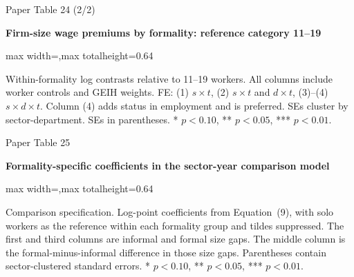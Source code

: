 \begin{frame}{Paper Table 24 (2/2)}
\begin{minipage}{\textwidth}\small\textbf{Firm-size wage premiums by formality: reference category 11--19}\end{minipage}\par\vspace{0.15cm}
\centering\begingroup\fontsize{8.5}{10}\selectfont
\setlength{\tabcolsep}{4pt}\renewcommand{\arraystretch}{1.06}
\begin{adjustbox}{max width=\textwidth,max totalheight=0.64\textheight}

\end{adjustbox}\endgroup\par\vspace{0.10cm}
{\fontsize{6.5}{7.5}\selectfont\raggedright Within-formality log contrasts relative to 11--19 workers. All columns include worker controls and GEIH weights. FE: (1) $s\times t$, (2) $s\times t$ and $d\times t$, (3)--(4) $s\times d\times t$. Column (4) adds status in employment and is preferred. SEs cluster by sector-department. SEs in parentheses. * $p<0.10$, ** $p<0.05$, *** $p<0.01$.\par}
\end{frame}

\begin{frame}{Paper Table 25}
\begin{minipage}{\textwidth}\small\textbf{Formality-specific coefficients in the sector-year comparison model}\end{minipage}\par\vspace{0.15cm}
\centering\begingroup\fontsize{8.5}{10}\selectfont
\setlength{\tabcolsep}{4pt}\renewcommand{\arraystretch}{1.06}
\begin{adjustbox}{max width=\textwidth,max totalheight=0.64\textheight}

\end{adjustbox}\endgroup\par\vspace{0.10cm}
{\fontsize{6.5}{7.5}\selectfont\raggedright Comparison specification. Log-point coefficients from Equation~(9), with solo workers as the reference within each formality group and tildes suppressed. The first and third columns are informal and formal size gaps. The middle column is the formal-minus-informal difference in those size gaps. Parentheses contain sector-clustered standard errors. * $p<0.10$, ** $p<0.05$, *** $p<0.01$.\par}
\end{frame}

